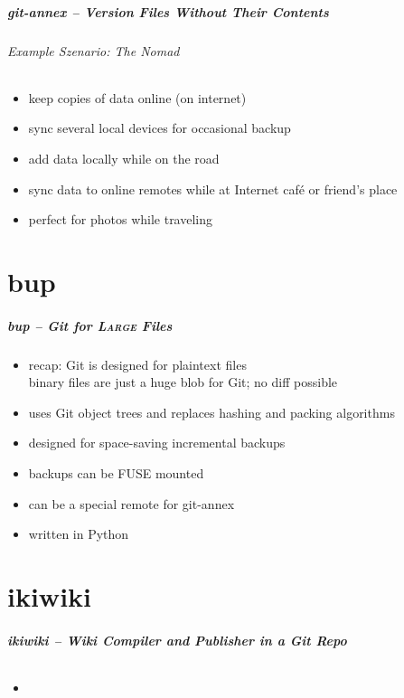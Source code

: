 \documentclass[english,hyperref={pdfpagelabels=false},aspectratio=169]{beamer}
\begin{document}
\begin{frame}
  \frametitle{git-annex -- Version Files Without Their Contents}
  \framesubtitle{Example Szenario: The Nomad}
  \begin{itemize}
    \item keep copies of data online (on internet)
    \item sync several local devices for occasional backup
    \item add data locally while on the road
    \item sync data to online remotes while at Internet café or friend's place
    \item perfect for photos while traveling
  \end{itemize}
\end{frame}



\part{bup}
\makepart

\begin{frame}[label=bup]
  \frametitle{bup -- Git for \textsc{Large} Files}
  \begin{itemize}
    \item recap: Git is designed for plaintext files\\
      {\scriptsize binary files are just a huge blob for Git; no diff possible}
    \item uses Git object trees and replaces hashing and packing algorithms
    \item designed for space-saving incremental backups
    \item backups can be FUSE mounted
    \item can be a special remote for git-annex
    \item written in Python
  \end{itemize}
\end{frame}


\part{ikiwiki}
\makepart

\begin{frame}[label=ikiwiki]
  \frametitle{ikiwiki -- Wiki Compiler and Publisher in a Git Repo}
  \framesubtitle{}
  \begin{itemize}
    \item 
  \end{itemize}
\end{frame}
\end{document}
